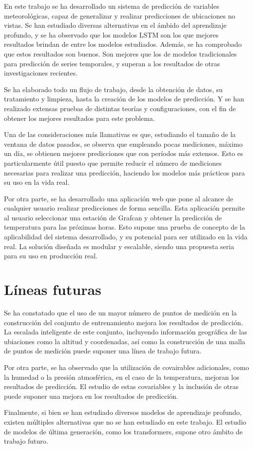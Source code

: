 
En este trabajo se ha desarrollado un sistema de predicción de variables meteorológicas, capaz de generalizar y realizar predicciones de ubicaciones no vistas. 
Se han estudiado diversas alternativas en el ámbido del aprendizaje profundo, y se ha observado que los modelos LSTM son los que mejores resultados brindan de entre los modelos estudiados. Además,
se ha comprobado que estos resultados son buenos. Son mejores que los de modelos tradicionales para predicción de series temporales, y superan a los resultados de otras investigaciones 
recientes.

Se ha elaborado todo un flujo de trabajo, desde la obtención de datos, su tratamiento y limpieza, hasta la creación de los modelos de predicción. Y se han 
realizado extensas pruebas de distintas teorías y configuraciones, con el fin de obtener los mejores resultados para este problema.

Una de las consideraciones más llamativas es que, estudiando el tamaño de la ventana de datos pasados, se observa que empleando pocas mediciones, máximo un día, se obtienen mejores predicciones que
con períodos más extensos. Esto es particularmente útil puesto que permite reducir el número de mediciones necesarias para realizar una predicción, haciendo los modelos 
más prácticos para su uso en la vida real.

Por otra parte, se ha desarrollado una aplicación web que pone al alcance de cualquier usuario realizar predicciones de forma sencilla. 
Esta aplicación permite al usuario seleccionar una estación de Grafcan y obtener la predicción de temperatura para las próximas horas.
Esto supone una prueba de concepto de la aplicabilidad del sistema desarrollado, y su potencial para ser utilizado en la vida real. La solución diseñada
es modular y escalable, siendo una propuesta seria para su uso en producción real.

\section{Líneas futuras}

Se ha constatado que el uso de un mayor número de puntos de medición en la construcción del conjunto de entrenamiento mejora los resultados de predicción.
La escalada inteligente de este conjunto, incluyendo información geográfica de las ubiaciones como la altitud y coordenadas, así como la construcción de una malla 
de puntos de medición puede suponer una línea de trabajo futura.

Por otra parte, se ha observado que la utilización de covairables adicionales, como la humedad o la presión atmosférica, en el caso de la temperatura, mejoran los resultados de predicción.
El estudio de estas covariables y la inclusión de otras puede suponer una mejora en los resultados de predicción.

Finalmente, si bien se han estudiado diversos modelos de aprendizaje profundo, existen múltiples alternativas que no se han estudiado en este trabajo.
El estudio de modelos de última generación, como los transformers, supone otro ámbito de trabajo futuro.